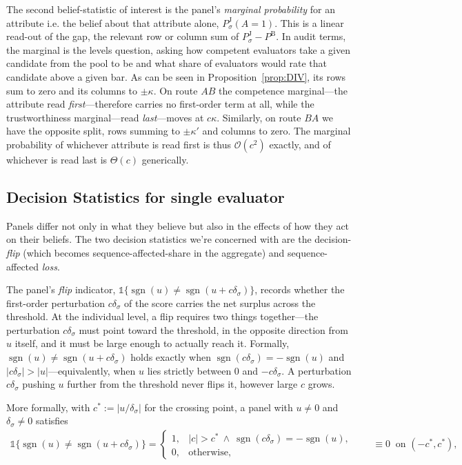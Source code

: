 \documentclass[a4paper,fleqn]{cas-sc}
\theoremstyle{remark}
\theoremstyle{definition}
\newcommand{\PB}{P^{\mathrm{B}}}
\newcommand{\PJ}{P^{\mathrm{J}}}
\newcommand{\sgn}{\operatorname{sgn}}
\newcommand{\bigO}{\mathcal{O}}
\begin{document}
The second belief-statistic of interest is the panel's \emph{marginal probability} for an attribute i.e. the belief about that attribute alone, $\PJ_\sigma(A{=}1)$. This
is a linear read-out of the gap, the relevant row or column sum of $\PJ_\sigma-\PB$. In audit terms, the marginal is the levels question, asking how competent evaluators take a given candidate from the pool to be and what share of evaluators would rate that candidate above a given bar. As can be seen in Proposition~\ref{prop:DIV}, its rows sum to zero and its columns to $\pm\kappa$. On route $AB$ the competence marginal---the attribute read \emph{first}---therefore carries no first-order term at all, while the trustworthiness marginal---read \emph{last}---moves at
$c\kappa$. Similarly, on route $BA$ we have the opposite split, rows summing to $\pm\kappa'$ and columns to zero. The marginal probability of whichever attribute is read first is thus $\bigO(c^{2})$ exactly, and of whichever is read last is $\Theta(c)$ generically.

\subsection{Decision Statistics for single evaluator}

Panels differ not only in what they believe but also in the effects of how they act on their beliefs. The two decision statistics we're concerned with are the decision-\emph{flip} (which becomes sequence-affected-share in the aggregate) and sequence-affected \emph{loss}.

The panel's \emph{flip} indicator, $\mathds{1}\{\sgn(u)\neq\sgn(u+c\delta_\sigma)\}$, records whether the first-order
perturbation $c\delta_\sigma$ of the score carries the net surplus across the threshold. At the individual level, a flip requires two things together---the perturbation
$c\delta_\sigma$ must point toward the threshold, in the opposite direction from $u$ itself,
and it must be large enough to actually reach it. Formally, $\sgn(u)\neq\sgn(u+c\delta_\sigma)$
holds exactly when $\sgn(c\delta_\sigma)=-\sgn(u)$ and $|c\delta_\sigma|>|u|$---equivalently,
when $u$ lies strictly between $0$ and $-c\delta_\sigma$. A perturbation $c\delta_\sigma$ pushing $u$ further from the threshold never flips it, however large $c$ grows.

More formally, with $c^{*}:=|u/\delta_\sigma|$ for the crossing point, a panel with $u\neq0$ and $\delta_\sigma\neq0$ satisfies
\begin{align*}
  \mathds{1}\{\sgn(u)\neq\sgn(u+c\delta_\sigma)\}= 
  \begin{cases}
    1, & |c|>c^{*} \ \wedge\ \sgn(c\delta_\sigma)=-\sgn(u),\\[2pt]
    0, & \text{otherwise},
  \end{cases}
  \qquad
  \equiv 0 \ \text{ on } (-c^{*},c^{*}),
\end{align*}
\end{document}
